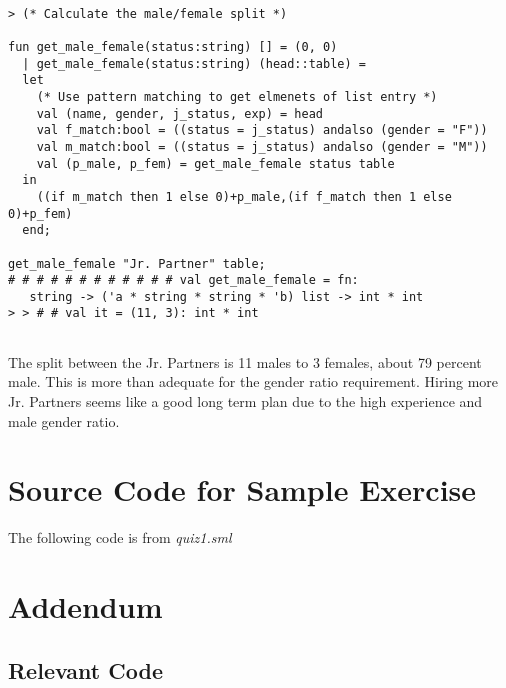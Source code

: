 \documentclass{report}
\begin{document}
\begin{session}
  \begin{scriptsize}
\begin{verbatim}

> (* Calculate the male/female split *)

fun get_male_female(status:string) [] = (0, 0)
  | get_male_female(status:string) (head::table) =
  let
    (* Use pattern matching to get elmenets of list entry *)
    val (name, gender, j_status, exp) = head
    val f_match:bool = ((status = j_status) andalso (gender = "F"))
    val m_match:bool = ((status = j_status) andalso (gender = "M"))
    val (p_male, p_fem) = get_male_female status table
  in
    ((if m_match then 1 else 0)+p_male,(if f_match then 1 else 0)+p_fem)
  end;

get_male_female "Jr. Partner" table;
# # # # # # # # # # # # val get_male_female = fn:
   string -> ('a * string * string * 'b) list -> int * int
> > # # val it = (11, 3): int * int


\end{verbatim}
  \end{scriptsize}
\end{session}

The split between the Jr. Partners is 11 males to 3 females, about 79 percent 
male. This is more than adequate for the gender ratio requirement. 
Hiring more Jr. Partners seems like a good long term plan due to the high
experience and male gender ratio.

\appendix{} 


\chapter{Source Code for Sample Exercise}
\label{cha:source-code-sample}

The following code is from \emph{quiz1.sml}


\chapter{Addendum}
\label{cha:addendum}

\section{Relevant Code}
\label{sec:relevant-code-1}
\end{document}
